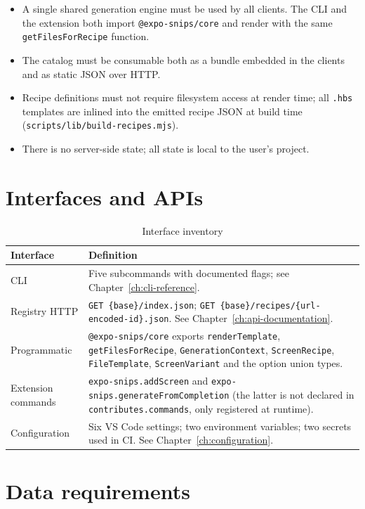 \begin{itemize}
  \item A single shared generation engine must be used by all clients. The CLI and
        the extension both import \texttt{@expo-snips/core} and render with the
        same \texttt{getFilesForRecipe} function.
  \item The catalog must be consumable both as a bundle embedded in the clients and
        as static JSON over HTTP.
  \item Recipe definitions must not require filesystem access at render time; all
        \texttt{.hbs} templates are inlined into the emitted recipe JSON at build
        time (\texttt{scripts/lib/build-recipes.mjs}).
  \item There is no server-side state; all state is local to the user's project.
\end{itemize}

\section{Interfaces and APIs}

\begin{longtable}{p{3.4cm}p{11cm}}
\caption{Interface inventory}\\
\toprule
\textbf{Interface} & \textbf{Definition} \\
\midrule

CLI & Five subcommands with documented flags; see Chapter~\ref{ch:cli-reference}. \\
Registry HTTP & \texttt{GET \{base\}/index.json};
\texttt{GET \{base\}/recipes/\{url-encoded-id\}.json}. See Chapter~\ref{ch:api-documentation}. \\
Programmatic & \texttt{@expo-snips/core} exports
\texttt{renderTemplate}, \texttt{getFilesForRecipe},
\texttt{GenerationContext}, \texttt{ScreenRecipe}, \texttt{FileTemplate},
\texttt{ScreenVariant} and the option union types. \\
Extension commands & \texttt{expo-snips.addScreen} and
\texttt{expo-snips.generateFromCompletion} (the latter is not declared in
\texttt{contributes.commands}, only registered at runtime). \\
Configuration & Six VS Code settings; two environment variables; two secrets used
in CI. See Chapter~\ref{ch:configuration}. \\
\bottomrule
\end{longtable}

\section{Data requirements}

